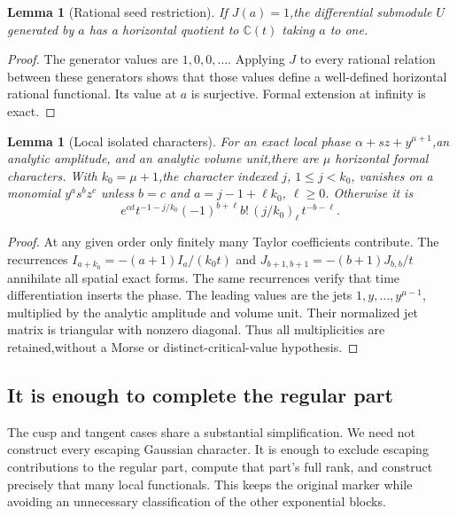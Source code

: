 \documentclass[11pt]{article}
\newtheorem{lemma}[theorem]{Lemma}
\theoremstyle{definition}\newtheorem{definition}[theorem]{Definition}
\theoremstyle{remark}\newtheorem{remark}[theorem]{Remark}
\begin{document}
\begin{lemma}[Rational seed restriction]\label{lem:seedfunctional}
If $J(a)=1$,the differential submodule $U$ generated by $a$ has a
horizontal quotient to $\mathbb C(t)$ taking $a$ to one.
\end{lemma}
\begin{proof}
The generator values are $1,0,0,\ldots$. Applying $J$ to every rational
relation between these generators shows that those values define a
well-defined horizontal rational functional. Its value at $a$ is
surjective. Formal extension at infinity is exact.
\end{proof}
\begin{lemma}[Local isolated characters]\label{lem:isolatedcharacters}
For an exact local phase $\alpha+sz+y^{\mu+1}$,an analytic amplitude,
and an analytic volume unit,there are $\mu$ horizontal formal
characters. With $k_0=\mu+1$,the character indexed $j$, $1\le j<k_0$,
vanishes on a monomial $y^a s^b z^c$ unless $b=c$ and
$a=j-1+\ell k_0$, $\ell\ge0$. Otherwise it is
\begin{equation}\label{eq:ordinarycharacters}
 e^{\alpha t}t^{-1-j/k_0}
       (-1)^{b+\ell}b!\,(j/k_0)_\ell\,t^{-b-\ell}.
\end{equation}
\end{lemma}
\begin{proof}
At any given order only finitely many Taylor coefficients contribute.
The recurrences $I_{a+k_0}=-(a+1)I_a/(k_0t)$ and
$J_{b+1,b+1}=-(b+1)J_{b,b}/t$ annihilate all spatial exact forms.
The same recurrences verify that time differentiation inserts the
phase. The leading values are the jets $1,y,\ldots,y^{\mu-1}$,
multiplied by the analytic amplitude and volume unit. Their normalized
jet matrix is triangular with nonzero diagonal. Thus all multiplicities
are retained,without a Morse or distinct-critical-value hypothesis.
\end{proof}
\subsection{It is enough to complete the regular part}
\label{sec:boundedregular}

The cusp and tangent cases share a substantial simplification.
We need not construct every escaping Gaussian character. It is
enough to exclude escaping contributions to the regular part,
compute that part's full rank, and construct precisely that many
local functionals. This keeps the original marker while avoiding
an unnecessary classification of the other exponential blocks.
\end{document}
